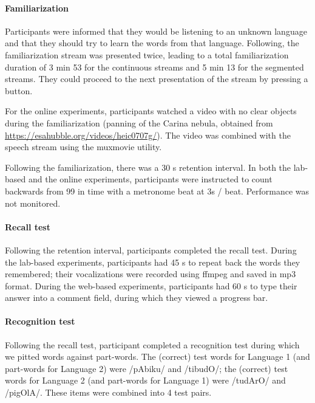 \documentclass[
]{article}
\begin{document}
\paragraph{Familiarization}\label{familiarization}

Participants were informed that they would be listening to an unknown
language and that they should try to learn the words from that language.
Following, the familiarization stream was presented twice, leading to a
total familiarization duration of 3 min 53 for the continuous streams
and 5 min 13 for the segmented streams. They could proceed to the next
presentation of the stream by pressing a button.

For the online experiments, participants watched a video with no clear
objects during the familiarization (panning of the Carina nebula,
obtained from \url{https://esahubble.org/videos/heic0707g/}). The video
was combined with the speech stream using the muxmovie utility.

Following the familiarization, there was a 30 s retention interval. In
both the lab-based and the online experiments, participants were
instructed to count backwards from 99 in time with a metronome beat at
3s / beat. Performance was not monitored.

\paragraph{Recall test}\label{recall-test}

Following the retention interval, participants completed the recall
test. During the lab-based experiments, participants had 45 s to repeat
back the words they remembered; their vocalizations were recorded using
ffmpeg and saved in mp3 format. During the web-based experiments,
participants had 60 s to type their answer into a comment field, during
which they viewed a progress bar.

\paragraph{Recognition test}\label{recognition-test}

Following the recall test, participant completed a recognition test
during which we pitted words against part-words. The (correct) test
words for Language 1 (and part-words for Language 2) were /pAbiku/ and
/tibudO/; the (correct) test words for Language 2 (and part-words for
Language 1) were /tudArO/ and /pigOlA/. These items were combined into 4
test pairs.
\end{document}

